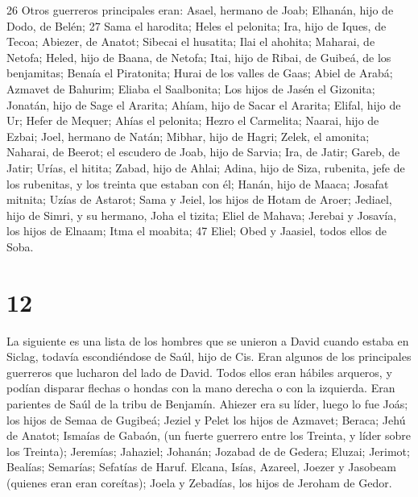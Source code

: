 26 Otros guerreros principales eran: Asael, hermano de Joab; Elhanán,
hijo de Dodo, de Belén; 27 Sama el harodita; Heles el pelonita;
 Ira, hijo de Iques, de Tecoa; Abiezer, de Anatot;
 Sibecai el husatita; Ilai el ahohita; 
Maharai, de Netofa; Heled, hijo de Baana, de Netofa;  Itai,
hijo de Ribai, de Guibeá, de los benjamitas; Benaía el Piratonita;
 Hurai de los valles de Gaas; Abiel de Arabá; 
Azmavet de Bahurim; Eliaba el Saalbonita;  Los hijos de
Jasén el Gizonita; Jonatán, hijo de Sage el Ararita; 
Ahíam, hijo de Sacar el Ararita; Elifal, hijo de Ur;  Hefer
de Mequer; Ahías el pelonita;  Hezro el Carmelita; Naarai,
hijo de Ezbai;  Joel, hermano de Natán; Mibhar, hijo de
Hagri;  Zelek, el amonita; Naharai, de Beerot; el escudero
de Joab, hijo de Sarvia;  Ira, de Jatir; Gareb, de Jatir;
 Urías, el hitita; Zabad, hijo de Ahlai; 
Adina, hijo de Siza, rubenita, jefe de los rubenitas, y los treinta que
estaban con él;  Hanán, hijo de Maaca; Josafat mitnita;
 Uzías de Astarot; Sama y Jeiel, los hijos de Hotam de
Aroer;  Jediael, hijo de Simri, y su hermano, Joha el
tizita;  Eliel de Mahava; Jerebai y Josavía, los hijos de
Elnaam; Itma el moabita; 47 Eliel; Obed y Jaasiel, todos ellos de Soba.

\hypertarget{section-11}{%
\section{12}\label{section-11}}

 La siguiente es una lista de los hombres que se unieron a
David cuando estaba en Siclag, todavía escondiéndose de Saúl, hijo de
Cis. Eran algunos de los principales guerreros que lucharon del lado de
David.  Todos ellos eran hábiles arqueros, y podían disparar
flechas o hondas con la mano derecha o con la izquierda. Eran parientes
de Saúl de la tribu de Benjamín.  Ahiezer era su líder,
luego lo fue Joás; los hijos de Semaa de Gugibeá; Jeziel y Pelet los
hijos de Azmavet; Beraca; Jehú de Anatot;  Ismaías de
Gabaón, (un fuerte guerrero entre los Treinta, y líder sobre los
Treinta); Jeremías; Jahaziel; Johanán; Jozabad de de Gedera;
 Eluzai; Jerimot; Bealías; Semarías; Sefatías de Haruf.
 Elcana, Isías, Azareel, Joezer y Jasobeam (quienes eran
eran coreítas);  Joela y Zebadías, los hijos de Jeroham de
Gedor.

